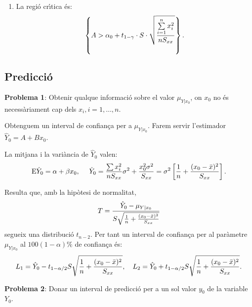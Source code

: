 \begin{enumerate}
La regi\'o cr\'{\i}tica \'es:
$$\left\{ A < \alpha_0 - t_{1-\gamma} \cdot S \cdot \sqrt{{\sum\limits_{i=1}^n
x_i^2 \over n S_{xx}}} \right\}.$$

\item
{}

La regi\'o cr\'{\i}tica \'es:
$$\left\{ A > \alpha_0 + t_{1-\gamma} \cdot S \cdot \sqrt{{\sum\limits_{i=1}^n
x_i^2 \over n S_{xx}}} \right\}.$$
\end{enumerate}

\subsection{Predicci\'o}

{\bf Problema 1}: Obtenir qualque informaci\'o sobre el valor $\mu_{Y|x_0}$, on
$x_0$ no \'es necess\`ariament cap dels $x_i,  i = 1, \ldots , n$.

Obtenguem un interval de confian\c ca per a $\mu_{Y|x_0}$. Farem servir
l'estimador $\hat{Y}_0 = A + B x_0$.

La mitjana i la vari\`ancia de $\hat{Y}_0$ valen:
$${\rm E}\hat{Y}_0 = \alpha + \beta x_0, \quad\ \hat{Y}_0 = {\sum\limits x_i^2
\over n S_{xx}} \sigma^2 + {x_0^2 \sigma^2 \over S_{xx}} = \sigma^2 \left[ {1
\over n} + {(x_0 - \bar{x})^2 \over S_{xx}} \right].$$

Resulta que, amb la hip\`otesi de normalitat,
$$T = {\hat{Y}_0 - \mu_{Y|x_0} \over S \sqrt{{1 \over n} + {(x_0 - \bar{x})^2
\over S_{xx}}}}$$
segueix una distribuci\'o $t_{n-2}$. Per tant un interval de confian\c ca per al
par\`ametre $\mu_{Y|x_0}$ al $100(1-\alpha) \% $ de confian\c{c}a \'es:
$$L_1 = \hat{Y}_0 - t_{1 - \alpha/2} S \sqrt{{1 \over n} + {(x_0 - \bar{x})^2
\over S_{xx}}}, \ \ \ L_2 = \hat{Y}_0 + t_{1 - \alpha/2} S \sqrt{{1 \over n} +
{(x_0 - \bar{x})^2 \over S_{xx}}}.$$

{\bf Problema 2}: Donar un interval de predicci\'o per a un sol valor $y_0$ de la
variable~$Y_0$.

